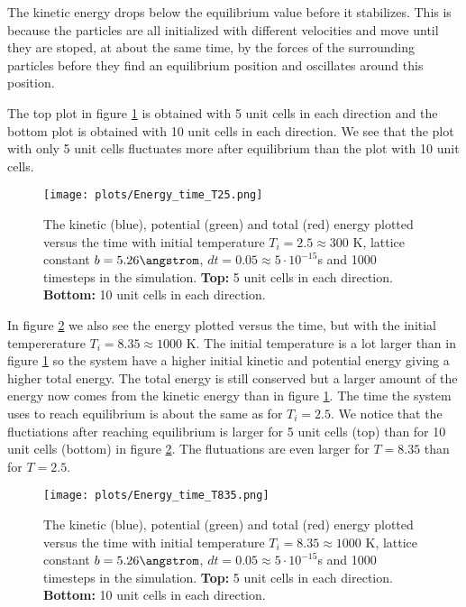 \documentclass[11pt,a4wide]{article}
\begin{document}
The kinetic energy drops below the equilibrium value before it stabilizes. This is because the particles are all initialized with different velocities and move until they are stoped, at about the same time, by the forces of the surrounding particles before they find an equilibrium position and oscillates around this position.  

The top plot in figure \ref{fig: Energy_time1} is obtained with 5 unit cells in each direction and the bottom plot is obtained with 10 unit cells in each direction. We see that the plot with only 5 unit cells fluctuates more after equilibrium than the plot with 10 unit cells. 

\begin{figure}[htp]
\centering
\texttt{[image: plots/Energy\_time\_T25.png]}
\caption{The kinetic (blue), potential (green) and total (red) energy plotted versus the time with initial temperature $T_i = 2.5 \approx 300$ K, lattice constant $b=5.26 \angstrom$, $dt=0.05\approx  5\cdot 10^{-15}$s and 1000 timesteps in the simulation. \textbf{Top:} 5 unit cells in each direction. \textbf{Bottom:} 10 unit cells in each direction.}
\label{fig: Energy_time1}
\end{figure}

In figure \ref{fig: Energy_time2} we also see the energy plotted versus the time, but with the initial tempererature $T_i = 8.35 \approx 1000$ K. The initial temperature is a lot larger than in figure \ref{fig: Energy_time1} so the system have a higher initial kinetic and potential energy giving a higher total energy. The total energy is still conserved but a larger amount of the energy now comes from the kinetic energy than in figure \ref{fig: Energy_time1}. The time the system uses to reach equilibrium is about the same as for $T_i=2.5$. We notice that the fluctiations after reaching equilibrium is larger for 5 unit cells (top) than for 10 unit cells (bottom) in figure \ref{fig: Energy_time2}. The flutuations are even larger for $T=8.35$ than for $T=2.5$. 

\begin{figure}[htp]
\centering
\texttt{[image: plots/Energy\_time\_T835.png]}
\caption{The kinetic (blue), potential (green) and total (red) energy plotted versus the time with initial temperature $T_i = 8.35 \approx 1000$ K, lattice constant $b=5.26 \angstrom$, $dt=0.05\approx  5\cdot 10^{-15}$s and 1000 timesteps in the simulation. \textbf{Top:} 5 unit cells in each direction. \textbf{Bottom:} 10 unit cells in each direction.}
\label{fig: Energy_time2}
\end{figure}
\end{document}
